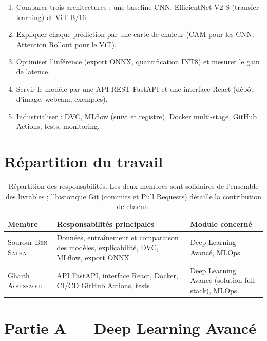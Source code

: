 \documentclass[11pt,a4paper]{article}
\begin{document}
\begin{enumerate}
  \item Comparer trois architectures : une baseline CNN, EfficientNet-V2-S (transfer learning) et ViT-B/16.
  \item Expliquer chaque prédiction par une carte de chaleur (CAM pour les CNN, Attention Rollout pour le ViT).
  \item Optimiser l'inférence (export ONNX, quantification INT8) et mesurer le gain de latence.
  \item Servir le modèle par une API REST FastAPI et une interface React (dépôt d'image, webcam, exemples).
  \item Industrialiser : DVC, MLflow (suivi et registre), Docker multi-stage, GitHub Actions, tests, monitoring.
\end{enumerate}

\section{Répartition du travail}

\begin{table}[H]
\centering\small
\begin{tabularx}{\textwidth}{@{}l>{\raggedright\arraybackslash}X>{\raggedright\arraybackslash}X@{}}
\toprule
\textbf{Membre} & \textbf{Responsabilités principales} & \textbf{Module concerné} \\
\midrule
Sourour \textsc{Ben Salha} & Données, entraînement et comparaison des modèles, explicabilité, DVC, MLflow, export ONNX & Deep Learning Avancé, MLOps \\
Ghaith \textsc{Aouissaoui} & API FastAPI, interface React, Docker, CI/CD GitHub Actions, tests & Deep Learning Avancé (solution full-stack), MLOps \\
\bottomrule
\end{tabularx}
\caption{Répartition des responsabilités. Les deux membres sont solidaires de l'ensemble des livrables ; l'historique Git (commits et Pull Requests) détaille la contribution de chacun.}
\end{table}

\newpage
\section*{\Huge\color{primaire}Partie A --- Deep Learning Avancé}
\end{document}
